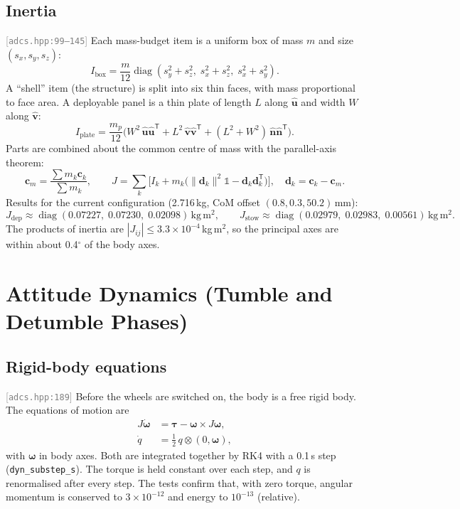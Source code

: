 \documentclass[11pt,a4paper]{article}
\newcommand{\vb}[1]{\boldsymbol{#1}}
\newcommand{\uv}[1]{\hat{\boldsymbol{#1}}}
\newcommand{\code}[1]{\texttt{#1}}
\newcommand{\src}[1]{\textcolor{gray}{\small[\texttt{#1}]}}
\newcommand{\tp}{^{\mathsf{T}}}
\begin{document}
\subsection{Inertia} \src{adcs.hpp:99--145}
Each mass-budget item is a uniform box of mass $m$ and size $(s_x, s_y, s_z)$:
\begin{equation}
I_{\text{box}} = \frac{m}{12}\operatorname{diag}(s_y^2+s_z^2,\; s_x^2+s_z^2,\; s_x^2+s_y^2).
\end{equation}
A ``shell'' item (the structure) is split into six thin faces, with mass proportional to face area. A deployable panel is a thin plate of length $L$ along $\uv u$ and width $W$ along $\uv v$:
\begin{equation}
I_{\text{plate}} = \frac{m_p}{12}\Big(W^2\,\uv u\uv u\tp + L^2\,\uv v\uv v\tp + (L^2+W^2)\,\uv n\uv n\tp\Big).
\end{equation}
Parts are combined about the common centre of mass with the parallel-axis theorem:
\begin{equation}
\vb c_m = \frac{\sum m_k\vb c_k}{\sum m_k},\qquad
J = \sum_k\Big[I_k + m_k\big(\lVert\vb d_k\rVert^2\mathbb 1 - \vb d_k\vb d_k\tp\big)\Big],\quad \vb d_k = \vb c_k - \vb c_m .
\end{equation}
Results for the current configuration (2.716\,kg, CoM offset $(0.8, 0.3, 50.2)$\,mm):
\begin{equation}
J_{\text{dep}} \approx \operatorname{diag}(0.07227,\; 0.07230,\; 0.02098)\,\mathrm{kg\,m^2},\qquad
J_{\text{stow}} \approx \operatorname{diag}(0.02979,\; 0.02983,\; 0.00561)\,\mathrm{kg\,m^2}.
\end{equation}
The products of inertia are $|J_{ij}| \le 3.3\times10^{-4}$\,kg\,m$^2$, so the principal axes are within about 0.4$^\circ$ of the body axes.

\section{Attitude Dynamics (Tumble and Detumble Phases)}

\subsection{Rigid-body equations} \src{adcs.hpp:189}
Before the wheels are switched on, the body is a free rigid body. The equations of motion are
\begin{align}
J\dot{\vb\omega} &= \vb\tau - \vb\omega\times J\vb\omega, \label{eq:euler}\\
\dot q &= \tfrac12\, q\otimes(0, \vb\omega), \label{eq:qdot}
\end{align}
with $\vb\omega$ in body axes. Both are integrated together by RK4 with a 0.1\,s step (\code{dyn\_substep\_s}). The torque is held constant over each step, and $q$ is renormalised after every step. The tests confirm that, with zero torque, angular momentum is conserved to $3\times10^{-12}$ and energy to $10^{-13}$ (relative).
\end{document}
